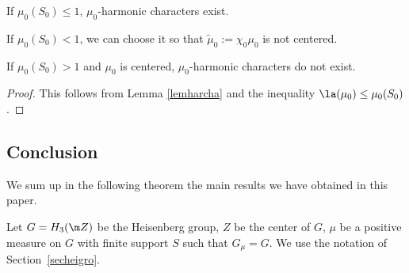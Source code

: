 \skpt
\begin{Cor}
\label{corharcha}
\begin{enumeratea}
\item
If $\mu_0(S_0)\leq 1$, $\mu_0$-harmonic characters exist.
\item
If $\mu_0(S_0)< 1$, we can choose it so that
$\widetilde{\mu}_0:=\chi_0\mu_0$ is not centered.
\item
If $\mu_0(S_0)>1$ and $\mu_0$ is centered, $\mu_0$-harmonic characters do not exist.
\end{enumeratea}
\end{Cor}

\begin{proof}
This follows from Lemma \ref{lemharcha} and the inequality $\la(\mu_0)\leq \mu_0(S_0)$.
\end{proof}

\subsection{Conclusion}
\label{secconclu}
\bq
We sum up in the following theorem
the main results we have obtained in this paper.
\eq

Let $G=H_3(\m Z)$ be the Heisenberg group,
$Z$ be the center of $G$, $\mu$ be a positive measure on $G$ with finite support $S$
such that $G_\mu=G$. We use the notation of Section~\ref{secheigro}.

